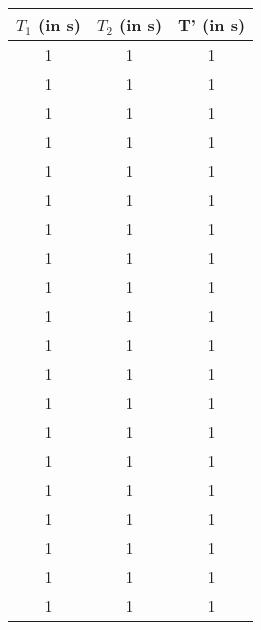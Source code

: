 \begin{tabular}{ccc}
\toprule
$T_1$ (in s) & $T_2$ (in s) & T' (in s) \\
\midrule
1 & 1 & 1 \\
1 & 1 & 1 \\
1 & 1 & 1 \\
1 & 1 & 1 \\
1 & 1 & 1 \\
1 & 1 & 1 \\
1 & 1 & 1 \\
1 & 1 & 1 \\
1 & 1 & 1 \\
1 & 1 & 1 \\
1 & 1 & 1 \\
1 & 1 & 1 \\
1 & 1 & 1 \\
1 & 1 & 1 \\
1 & 1 & 1 \\
1 & 1 & 1 \\
1 & 1 & 1 \\
1 & 1 & 1 \\
1 & 1 & 1 \\
1 & 1 & 1 \\
\bottomrule
\end{tabular}
